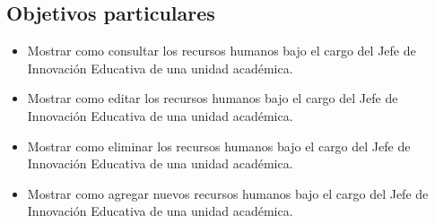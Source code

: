     \subsection{Objetivos particulares}
    \begin{itemize}
        \item Mostrar como consultar los recursos humanos bajo el cargo del Jefe de Innovación Educativa de una unidad académica.
        \item Mostrar como editar los recursos humanos bajo el cargo del Jefe de Innovación Educativa de una unidad académica.
        \item Mostrar como eliminar los recursos humanos bajo el cargo del Jefe de Innovación Educativa de una unidad académica.
        \item Mostrar como agregar nuevos recursos humanos bajo el cargo del Jefe de Innovación Educativa de una unidad académica.
    \end{itemize}
